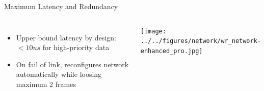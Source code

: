 \documentclass[compress,red]{beamer}
\begin{document}
\begin{frame}{Maximum Latency and Redundancy}

\begin{columns}[c]

      \begin{itemize}
	      \item Upper bound latency by design: \\ $<10us$ for high-priority data
	      \item On fail of link, reconfigures network automatically while loosing maximum 2 frames
      \end{itemize}
% 
    \begin{center}
    \texttt{[image: ../../figures/network/wr\_network-enhanced\_pro.jpg]}
    \end{center}
\end{columns}
\end{frame}

%
%
%
%
\end{document}
